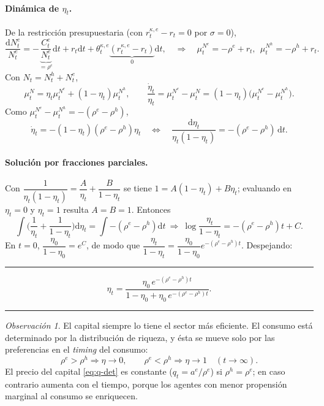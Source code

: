 \documentclass[11pt]{article}
\theoremstyle{definition}
\theoremstyle{remark}
\newtheorem*{obs}{Observación}
\newenvironment{resultado}
  {\par\medskip\noindent\begin{minipage}{\linewidth}\rule{\linewidth}{0.4pt}\par\smallskip\noindent}
  {\par\smallskip\noindent\rule{\linewidth}{0.4pt}\end{minipage}\medskip\par}
\newcommand{\dd}{\mathrm{d}}
\newcommand{\aE}{a^{e}}
\newcommand{\re}{\rho^{e}}
\newcommand{\rh}{\rho^{h}}
\newcommand{\thke}{\theta_t^{\kappa,e}}
\begin{document}
\paragraph{Dinámica de $\eta_t$.} De la restricción presupuestaria (con $r_t^{\kappa,e}-r_t=0$ por $\sigma=0$),
\[
\frac{\dd N_t^{e}}{N_t^{e}}=-\underbrace{\frac{C_t^{e}}{N_t^{e}}}_{=\re}\dd t+r_t\dd t+\thke\underbrace{(r_t^{\kappa,e}-r_t)}_{0}\dd t,
\quad\Rightarrow\quad
\mu_t^{N^{e}}=-\re+r_t,\ \ \mu_t^{N^{h}}=-\rh+r_t.
\]
Con $N_t=N_t^{h}+N_t^{e}$,
\[
\mu_t^{N}=\eta_t\mu_t^{N^{e}}+(1-\eta_t)\mu_t^{N^{h}},
\qquad
\frac{\dot\eta_t}{\eta_t}=\mu_t^{N^{e}}-\mu_t^{N}=(1-\eta_t)\big(\mu_t^{N^{e}}-\mu_t^{N^{h}}\big).
\]
Como $\mu_t^{N^{e}}-\mu_t^{N^{h}}=-(\re-\rh)$,
\begin{equation}\label{eq:eta-ode-det}
\dot\eta_t=-(1-\eta_t)(\re-\rh)\eta_t
\quad\Longleftrightarrow\quad
\frac{\dd\eta_t}{\eta_t(1-\eta_t)}=-(\re-\rh)\,\dd t.
\end{equation}

\paragraph{Solución por fracciones parciales.} Con $\dfrac{1}{\eta_t(1-\eta_t)}=\dfrac{A}{\eta_t}+\dfrac{B}{1-\eta_t}$ se tiene $1=A(1-\eta_t)+B\eta_t$; evaluando en $\eta_t=0$ y $\eta_t=1$ resulta $A=B=1$. Entonces
\[
\int\!\Big(\frac{1}{\eta_t}+\frac{1}{1-\eta_t}\Big)\dd\eta_t=\int-(\re-\rh)\dd t
\ \Rightarrow\
\log\frac{\eta_t}{1-\eta_t}=-(\re-\rh)t+C.
\]
En $t=0$, $\dfrac{\eta_0}{1-\eta_0}=e^{C}$, de modo que $\dfrac{\eta_t}{1-\eta_t}=\dfrac{\eta_0}{1-\eta_0}e^{-(\re-\rh)t}$. Despejando:
\begin{resultado}
\begin{equation}\label{eq:eta-closed}
\eta_t=\frac{\eta_0\,e^{-(\re-\rh)t}}{1-\eta_0+\eta_0\,e^{-(\re-\rh)t}}.
\end{equation}
\end{resultado}

\begin{obs}
El capital siempre lo tiene el sector más eficiente. El consumo está determinado por la distribución de riqueza, y ésta se mueve solo por las preferencias en el \emph{timing} del consumo:
\[
\re>\rh\Rightarrow \eta\to0,\qquad \re<\rh\Rightarrow \eta\to1\quad(t\to\infty).
\]
El precio del capital \eqref{eq:q-det} es constante ($q_t=\aE/\re$) si $\rh=\re$; en caso contrario aumenta con el tiempo, porque los agentes con menor propensión marginal al consumo se enriquecen.
\end{obs}
\end{document}
